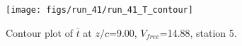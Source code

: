\begin{figure}[H]
\centering
\texttt{[image: figs/run\_41/run\_41\_T\_contour]}
\caption{Contour plot of $\overline{t}$ at $z/c$=9.00, $V_{free}$=14.88, station 5.}
\label{fig:run_41_T_contour}
\end{figure}


